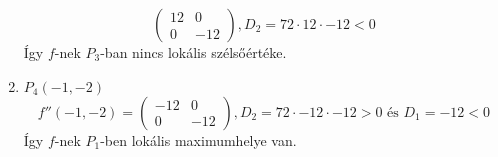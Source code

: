 \documentclass[a4paper,12pt]{article}
\begin{document}
\begin{solution}
\begin{enumerate}
\begin{equation*}
\begin{pmatrix}
					12 & 0 \\
					0 & -12
				\end{pmatrix}, D_2 = 72 \cdot 12 \cdot -12 < 0
			\end{equation*}
			Így $f$-nek $P_3$-ban nincs lokális szélsőértéke.
			\item $P_4(-1,-2)$
			\begin{equation*}
				f''(-1,-2) =
				\begin{pmatrix}
					-12 & 0 \\
					0 & -12
				\end{pmatrix}, D_2 = 72 \cdot -12 \cdot -12 > 0 \text{ és } D_1 = -12 < 0 
			\end{equation*}
			Így $f$-nek $P_1$-ben lokális maximumhelye van.
		\end{enumerate}

\end{solution}
\end{document}
